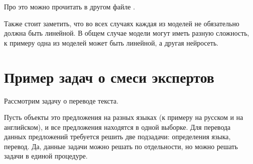 \documentclass[12pt, twoside]{article}
\numberwithin{equation}{section}
\begin{document}
Про это можно прочитать в другом файле .

Также стоит заметить, что во всех случаях каждая из моделей не обязательно должна быть линейной. В общем случае модели могут иметь разную сложность, к примеру одна из моделей может быть линейной, а другая нейросеть.

\section{Пример задач о смеси экспертов}
Рассмотрим задачу о переводе текста.

Пусть объекты это предложения на разных языках (к примеру на русском и на английском), и все предложения находятся в одной выборке. Для перевода данных предложений требуется решить две подзадачи: определения языка, перевод. Да, данные задачи можно решать по отдельности, но можно решать задачи в единой процедуре.
\end{document}
